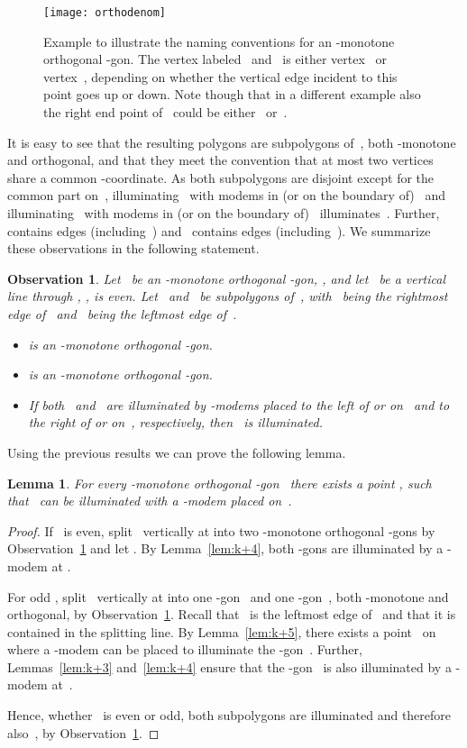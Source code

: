 \documentclass[A4]{article}
\newtheorem{lemma}[theorem]{Lemma}
\newtheorem{observation}[theorem]{Observation}
\begin{document}
\begin{figure}[htb]
  \centering
  \texttt{[image: orthodenom]}
  \caption{Example to illustrate the naming conventions for an -monotone orthogonal -gon.
    The vertex labeled~ and~ is either vertex~ or vertex~, depending on whether the vertical edge incident to this point goes up or down.
    Note though that in a different example also the right end point of~ could be either~ or~.}
  \label{fig:orthonaming}
\end{figure}

It is easy to see that the resulting polygons are subpolygons of~, both -monotone and orthogonal, and that they meet the convention that at most two vertices share a common -coordinate.
As both subpolygons are disjoint except for the common part on~, illuminating~ with modems in (or on the boundary of)~ and illuminating~ with  modems in (or on the boundary of)~ illuminates~.
Further,  contains  edges (including~) and~ contains  edges (including~).
We summarize these observations in the following statement.

\begin{observation}\label{obs:orthosplit}
Let~ be an -monotone orthogonal -gon, , and let~ be a vertical line through , ,  is even.
Let~ and~ be subpolygons of~, with~ being the rightmost edge of~ and~ being the leftmost edge of~.
\begin{itemize}\vspace*{-0.5ex}
\item  is an -monotone orthogonal -gon.
\item  is an -monotone orthogonal -gon.
\item If both~ and~ are illuminated by \mbox{-modems} placed to the left of or on~ and to the right of or on~, respectively, then~ is illuminated.
\end{itemize}
\end{observation}



Using the previous results we can prove the following lemma.

\begin{lemma}\label{lem:2k+6}
For every -monotone orthogonal -gon~ there exists a point , such that~ can be illuminated with a \mbox{-modem} placed on~.
\end{lemma}
\begin{proof}
  If~ is even, split~ vertically at  into two -monotone orthogonal -gons by Observation~\ref{obs:orthosplit} and let .
  By Lemma~\ref{lem:k+4}, both -gons are illuminated by a \mbox{-modem} at .


  For odd , split~ vertically at  into one -gon~ and one -gon~, both -monotone and orthogonal, by Observation~\ref{obs:orthosplit}.
  Recall that~ is the leftmost edge of~ and that it is contained in the splitting line. 
By Lemma~\ref{lem:k+5}, there exists a point~ on  where a \mbox{-modem} can be placed to illuminate the -gon~.
  Further, Lemmas~\ref{lem:k+3} and~\ref{lem:k+4} ensure that the -gon~ is also illuminated by a \mbox{-modem} at~.

  Hence, whether~ is even or odd, both subpolygons are illuminated and therefore also~, by Observation~\ref{obs:orthosplit}. \end{proof}
\end{document}
